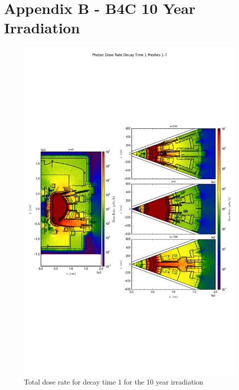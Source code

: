 \documentclass[12pt]{article}
\begin{document}
\section{Appendix B - B4C 10 Year Irradiation}
\begin{figure}[ht!]
\centering
\includegraphics[trim={0cm 8cm, 0cm 8cm},clip,scale=0.75]{../plots/final_model_with_b4c/10year/Photon_Dose_Rate_Decay_Time_1_Meshes_1-7.png}
\caption{Total dose rate for decay time 1 for the 10 year irradiation}
\label{fig:photons_10y_dc1_nob4c_dose}
\end{figure}
\end{document}
